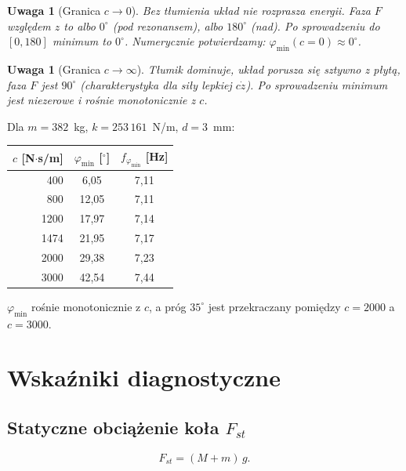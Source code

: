 \documentclass[11pt,a4paper]{article}
\theoremstyle{plainpol}
\newtheorem{uwaga}[definicja]{Uwaga}
\begin{document}
\begin{uwaga}[Granica $c\to 0$]
Bez tłumienia układ \emph{nie rozprasza energii}. Faza $F$ względem $z$
to albo $0^\circ$ (pod rezonansem), albo $180^\circ$ (nad). Po
sprowadzeniu do $[0,180]$ minimum to $0^\circ$. Numerycznie potwierdzamy:
$\varphi_{\min}(c=0) \approx 0^\circ$.
\end{uwaga}

\begin{uwaga}[Granica $c\to\infty$]
Tłumik dominuje, układ porusza się sztywno z płytą, faza $F$ jest
$90^\circ$ (charakterystyka dla siły lepkiej $c\dot{z}$). Po
sprowadzeniu minimum jest niezerowe i \emph{rośnie monotonicznie} z $c$.
\end{uwaga}

\begin{przyklad}
Dla $m = 382$~kg, $k = 253\,161$~N/m, $d = 3$~mm:
\begin{center}
\begin{tabular}{rcc}
\toprule
$c$ [N$\cdot$s/m] & $\varphi_{\min}$ [$^\circ$] & $f_{\varphi_{\min}}$ [Hz] \\
\midrule
400  &  6{,}05 & 7{,}11 \\
800  & 12{,}05 & 7{,}11 \\
1200 & 17{,}97 & 7{,}14 \\
1474 & 21{,}95 & 7{,}17 \\
2000 & 29{,}38 & 7{,}23 \\
3000 & 42{,}54 & 7{,}44 \\
\bottomrule
\end{tabular}
\end{center}
$\varphi_{\min}$ rośnie monotonicznie z $c$, a próg $35^\circ$ jest
przekraczany pomiędzy $c=2000$ a $c=3000$.
\end{przyklad}

\section{Wskaźniki diagnostyczne}\label{sec:wskazniki}

\subsection{Statyczne obciążenie koła $F_{st}$}

\begin{equation}
  F_{st} = (M + m)\,g.
\end{equation}
\end{document}

